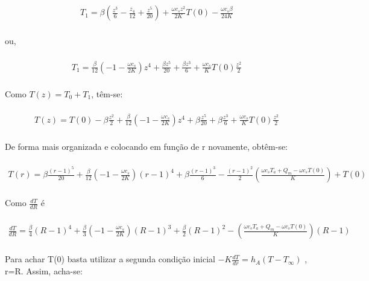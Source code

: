 \begin{gather} \nonumber\\
T_{1} = \beta \left(\frac{z^{3}}{6} - \frac{z_{4}}{12} + \frac{z^{5}}{20}\right) +  \frac{\omega c_{s}z^{2}}{2K} T(0) - \frac{\omega c_{s}\beta}{24K}
\nonumber\\\end{gather}

ou,

\begin{gather} \nonumber\\
T_{1} = \frac{\beta}{12} \left(-1 - \frac{\omega c_{s}}{2K}\right)z^{4} +  \frac{\beta z^{5}}{20} + \frac{\beta z^{3}}{6} + \frac{\omega c_{s}}{K}T(0)\frac{z^{2}}{2}
\nonumber\\\end{gather}

Como $T(z) = T_{0} + T_{1}$, têm-se:


\begin{gather} \nonumber\\
T(z) = T(0) - \beta \frac{z^{2}}{2} + \frac{\beta}{12}\left( -1 - \frac{\omega c_{s}}{2K}\right) z^{4} + \beta\frac{z^{5}}{20} + \beta\frac{z^{3}}{6} + \frac{\omega c_{s}}{K} T(0)\frac{z^2}{2}
\nonumber\\\end{gather}

De forma mais organizada e colocando em função de r novamente, obtêm-se:

\begin{gather} \nonumber\\
T(r) = \beta \frac{(r-1)^{5}}{20} + \frac{\beta}{12}\left( -1 - \frac{\omega c_{s}}{2K}\right)( r-1)^{4} + \beta\frac{(r-1)^{3}}{6} - \frac{(r-1)^{2}}{2}\left(\frac{\omega c_{s} T_{a} + Q_{m} - \omega c_{s} T(0)}{K}\right) + T(0)
\nonumber\\\end{gather}

Como $\frac{dT}{dR}$ é

\begin{gather} \nonumber\\
\frac{dT}{dR} = \frac{\beta}{4}(R-1)^{4} + \frac{\beta}{3}\left(-1-\frac{\omega c_{s}}{2K}\right)(R-1)^{3} + \frac{\beta}{2} (R-1)^{2} - \left(\frac{\omega c_{s} T_{a} + Q_{m} - \omega c_{s} T(0)}{K}\right)(R-1)
\nonumber\\\end{gather}

Para achar T(0) basta utilizar a  segunda condição inicial $-K\frac{dT}{dr} = h_{A}(T-T_{\infty})$ , r=R. Assim, acha-se:

